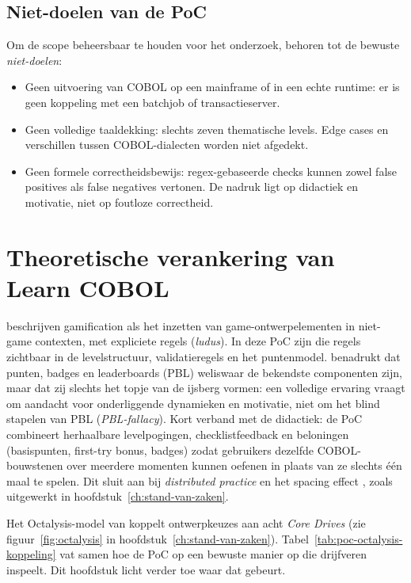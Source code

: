 \subsection{Niet-doelen van de PoC}
Om de scope beheersbaar te houden voor het onderzoek, behoren tot de bewuste \textit{niet-doelen}:
\begin{itemize}
    \item Geen uitvoering van COBOL op een mainframe of in een echte runtime: er is geen koppeling met een batchjob of transactieserver.
    \item Geen volledige taaldekking: slechts zeven thematische levels. Edge cases en verschillen tussen COBOL-dialecten worden niet afgedekt.
    \item Geen formele correctheidsbewijs: regex-gebaseerde checks kunnen zowel false positives als false negatives vertonen. De nadruk ligt op didactiek en motivatie, niet op foutloze correctheid.
\end{itemize}

\section{Theoretische verankering van Learn COBOL}
\label{sec:poc-theorie}

\textcite{Deterding2011} beschrijven gamification als het inzetten van game-\allowbreak ontwerpelementen in niet-game contexten, met expliciete regels (\textit{ludus}).
In deze PoC zijn die regels zichtbaar in de levelstructuur, validatieregels en het puntenmodel.
\textcite{KevinWerbach2020} benadrukt dat punten, badges en leaderboards (PBL) weliswaar de bekendste componenten zijn, maar dat zij slechts het topje van de ijsberg vormen: een volledige ervaring vraagt om aandacht voor onderliggende dynamieken en motivatie, niet om het blind stapelen van PBL (\textit{PBL-fallacy}).
Kort verband met de didactiek: de PoC combineert herhaalbare levelpogingen, checklistfeedback en beloningen (basispunten, first-try bonus, badges) zodat gebruikers dezelfde COBOL-bouwstenen over meerdere momenten kunnen oefenen in plaats van ze slechts één maal te spelen. Dit sluit aan bij \emph{distributed practice} en het spacing effect \autocite{Cepeda2006}, zoals uitgewerkt in hoofdstuk~\ref{ch:stand-van-zaken}.

Het Octalysis-model van \textcite{Chou2015} koppelt ontwerpkeuzes aan acht \textit{Core Drives} (zie figuur~\ref{fig:octalysis} in hoofdstuk~\ref{ch:stand-van-zaken}).
Tabel~\ref{tab:poc-octalysis-koppeling} vat samen hoe de PoC op een bewuste manier op die drijfveren inspeelt.
Dit hoofdstuk licht verder toe waar dat gebeurt.

